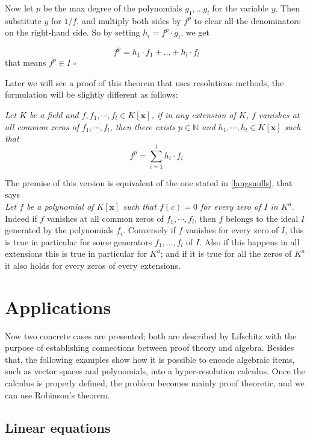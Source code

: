 \documentclass[a4paper,12pt,oneside]{book}
\newcommand*{\QED}{\hfill\ensuremath{\square}}
\begin{document}
\noindent Now let $p$ be the max degree of the polynomials $g_1,...g_l$ for the variable $y$. Then
substitute $y$ for $1/f$, and multiply both sides by  $f^p$ to clear all the denominators on the right-hand side. So by setting $h_i= f^p \cdot g_i$, we get

$$ f^p= h_1\cdot f_1 + ...+ h_l\cdot f_l   $$
that means $f^p\in I$  \QED

\noindent Later we will see a proof of this theorem that uses resolutions methods, the formulation will be slightly different as follows:

\noindent\textit{Let $K$ be a field and $f,f_1,\cdots, f_l \in K[\mathbf{x}]$, if in any extension of $K$, $f$ vanishes at all common zeros of $f_1,\cdots, f_l$, then there exists $p\in \mathbb{N}$ and $h_1,\cdots, h_l \in K[\mathbf{x}]$ such that} 
$$
f^p = \sum_{i=1}^l h_i \cdot f_i
$$

\noindent The premise of this version is equivalent of the one stated in \ref{langsnulls}, that says\\ \textit{Let $f$ be a polynomial of $K[\mathbf{x}]$ such that $f(c)=0$ for every zero of $I$ in $K^a$}.
 Indeed if $f$ vanishes at all common zeros of $f_1,\cdots, f_l$, then $f$ belongs to the ideal $I$ generated by the polynomials  $f_i$. Conversely if $f$ vanishes for every zero of $I$, this is true in particular for some generators $f_1,...,f_l$ of $I$. Also if this happens in all extensions this is true in particular for $K^a$; and if it is true for all the zeros of $K^a$ it also holds for every zeros of every extensions.


\section{Applications}
Now two concrete cases are presented; both are described by Lifschitz \cite{lifschitz} with the purpose of establishing connections between proof theory and algebra. Besides that, the following examples show how it is possible to encode algebraic items, such as vector spaces and polynomials, into a hyper-resolution calculus. Once the calculus is properly defined, the problem becomes mainly proof theoretic, and we can use Robinson's theorem.


\subsection*{Linear equations}
 
\end{document}
